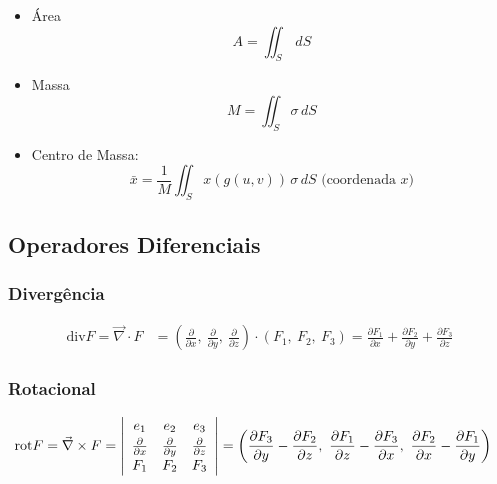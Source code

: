 \documentclass[11pt, a4paper]{article}
\begin{document}
\begin{itemize}
    \item Área
          \begin{equation*}
              A = \iint_S \, dS
          \end{equation*}
    \item Massa
          \begin{equation*}
              M = \iint_S \sigma \, dS
          \end{equation*}
    \item Centro de Massa:
          \begin{equation*}
              \bar{x} = \frac{1}{M} \iint_S x(g(u, v)) \, \sigma \, dS
              \text{ \ \ \ \ \  (coordenada $x$)}
          \end{equation*}
\end{itemize}

\subsection{Operadores Diferenciais}

\subsubsection{Divergência}

\begin{align*}
    \text{div} F = \vec{\nabla} \cdot F & = \left(\frac{\partial}{\partial x}
    ,\ \frac{\partial}{\partial y}
    ,\ \frac{\partial}{\partial z}\right)
    \cdot (F_1,\ F_2,\ F_3)
    = \frac{\partial F_1}{\partial x}
    + \frac{\partial F_2}{\partial y}
    + \frac{\partial F_3}{\partial z}
\end{align*}

\subsubsection{Rotacional}

\begin{align*}
    \text{rot} F = \vec{\nabla} \times F & =
    \left\vert
    \begin{array}{c c c}
        e_1                         & e_2 & e_3 \\[2pt]
        \frac{\partial}{\partial x} &
        \frac{\partial}{\partial y} &
        \frac{\partial}{\partial z}             \\[2pt]
        F_1                         & F_2 & F_3
    \end{array}
    \right\vert
    = \left(\frac{\partial F_3}{\partial y} - \frac{\partial F_2}{\partial z}
    ,\ \frac{\partial F_1}{\partial z} - \frac{\partial F_3}{\partial x}
    ,\ \frac{\partial F_2}{\partial x} - \frac{\partial F_1}{\partial y}
    \right)
\end{align*}
\end{document}
